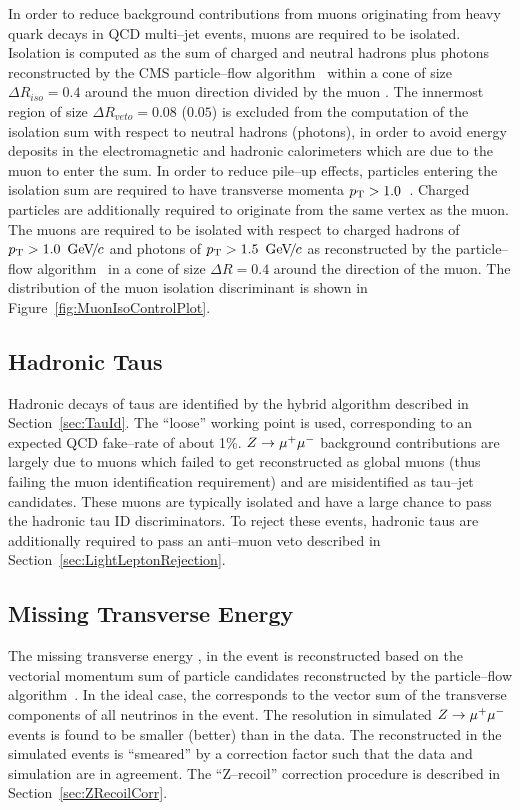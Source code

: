 In order to reduce background contributions from muons originating from heavy
quark decays in QCD multi--jet events, muons are required to be isolated.
Isolation is computed as the \pt sum of charged and neutral hadrons plus photons
reconstructed by the CMS particle--flow algorithm~\cite{CMS-PAS-PFT-09-001}
within a cone of size $\Delta R_{iso} = 0.4$ around the muon direction divided
by the muon \pt.  The
innermost region of size $\Delta R_{veto} = 0.08$ ($0.05$) is excluded from the
computation of the isolation \pt sum with respect to neutral hadrons (photons),
in order to avoid energy deposits in the electromagnetic and hadronic
calorimeters which are due to the muon to enter the sum.  In order to reduce
pile--up effects, particles entering the isolation \pt sum are required to have
transverse momenta $p_{\mathrm{T}} > 1.0$~\GeVc.  Charged particles are additionally
required to originate from the same vertex as the muon.  The muons are required
to be isolated with respect to charged hadrons of $p_{\mathrm{T}} > 1.0~{\,\text{Ge\hspace{-.08em}V\hspace{-0.16em}/\hspace{-0.08em}}c}$ and photons
of $p_{\mathrm{T}} > 1.5~{\,\text{Ge\hspace{-.08em}V\hspace{-0.16em}/\hspace{-0.08em}}c}$ as reconstructed by the particle--flow
algorithm~\cite{CMS-PAS-PFT-09-001} in a cone of size $\Delta R = 0.4$ around
the direction of the muon.  The distribution of the muon isolation discriminant
is shown in Figure~\ref{fig:MuonIsoControlPlot}.

\subsection{Hadronic Taus}

Hadronic decays of taus are identified by the \hpsTanc hybrid algorithm
described in Section~\ref{sec:TauId}.  The ``loose'' working point is used,
corresponding to an expected QCD fake--rate of about 1\%. $Z \to \mu^+\mu^-$ background
contributions are largely due to muons which failed to get reconstructed as
global muons (thus failing the muon identification requirement) and are
misidentified as tau--jet candidates.  These muons are typically isolated and
have a large chance to pass the hadronic tau ID discriminators.  To reject these
events, hadronic taus are additionally required to pass an anti--muon veto
described in Section~\ref{sec:LightLeptonRejection}. 

\subsection{Missing Transverse Energy}

The missing transverse energy \MET, in the event is reconstructed based on the
vectorial momentum sum of particle candidates reconstructed by the
particle--flow algorithm~\cite{CMS-PAS-PFT-09-001, CMS-PAS-JME-10-005}.  In the
ideal case, the \MET corresponds to the vector sum of the transverse components
of all neutrinos in the event.  The \MET resolution in simulated $Z\to\mu^+\mu^-$
events is found to be smaller (better) than in the data.   The reconstructed
\MET in the simulated events is ``smeared'' by a correction factor such that the
data and simulation are in agreement.  The ``Z--recoil'' \MET correction
procedure is described in Section~\ref{sec:ZRecoilCorr}.

